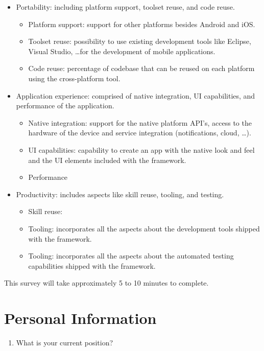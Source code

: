 \begin{itemize}
    \item Portability: including platform support, toolset reuse, and code reuse.
    \begin{itemize}
        \item Platform support: support for other platforms besides Android and iOS. 
        \item Toolset reuse: possibility to use existing development tools like Eclipse, Visual Studio, \ldots for the development of mobile applications. 
        \item Code reuse: percentage of codebase that can be reused on each platform using the cross-platform tool.
    \end{itemize}
    \item Application experience: comprised of native integration, UI capabilities, and performance of the application. 
    \begin{itemize}
        \item Native integration: support for the native platform API's, access to the hardware of the device and service integration (notifications, cloud, \ldots). 
        \item UI capabilities: capability to create an app with the native look and feel and the UI elements included with the framework.
        \item Performance
    \end{itemize}
    \item Productivity: includes aspects like skill reuse, tooling, and testing. 
    \begin{itemize}
        \item Skill reuse:
        \item Tooling: incorporates all the aspects about the development tools shipped with the framework.
        \item Tooling: incorporates all the aspects about the automated testing capabilities shipped with the framework.
    \end{itemize}
\end{itemize}

This survey will take approximately 5 to 10 minutes to complete.

\section{Personal Information}

\begin{enumerate}
    \item What is your current position?
\end{enumerate}

